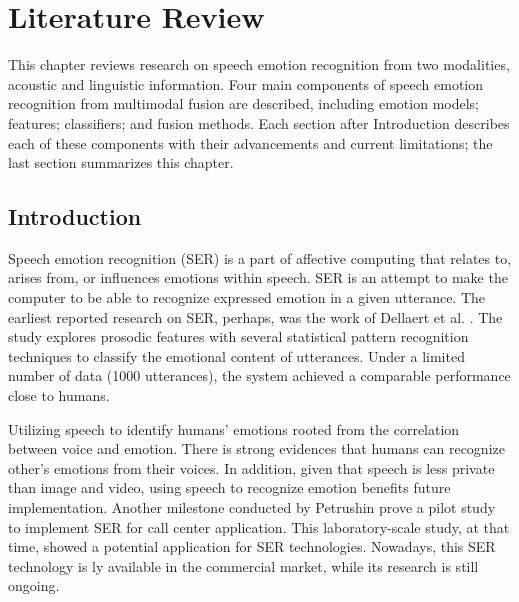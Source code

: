 \chapter{Literature Review}

This chapter reviews research on speech emotion recognition from two
modalities, acoustic and linguistic information. Four main components of speech
emotion recognition from multimodal fusion are described, including emotion
models; features; classifiers; and fusion methods. Each section after
Introduction describes each of these components with their advancements and
current limitations; the last section summarizes this chapter.

\section{Introduction}
Speech emotion recognition (SER) is a part of affective computing that relates
to, arises from, or influences emotions \cite{Picard} within speech. SER is an
attempt to make the computer to be able to recognize expressed emotion in a
given utterance. The earliest reported research on SER, perhaps, was the work
of Dellaert et al. \cite{Dellaert}. The study explores prosodic features with
several statistical pattern recognition techniques to classify the emotional
content of utterances. Under a limited number of data (1000 utterances), the
system achieved a comparable performance close to humans. 

Utilizing speech to identify humans' emotions rooted from the correlation
between voice and emotion. There is strong evidences that humans can recognize
other's emotions from their voices. In addition, given that speech is less
private than image and video, using speech to recognize emotion benefits future
implementation. Another milestone conducted by Petrushin \cite{Petrushin1998}
prove a pilot study to implement SER for call center application. This
laboratory-scale study, at that time, showed a potential application for SER
technologies.  Nowadays, this SER technology is ly available in the
commercial market, while its research is still ongoing. 

